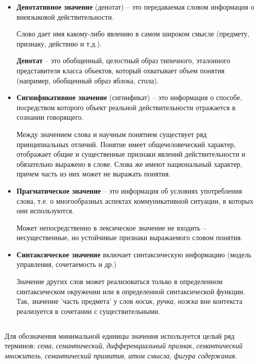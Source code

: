 \documentclass{article}
\begin{document}
\begin{itemize}
    \item \textbf{Денотативное значение} (денотат) -- это передаваемая словом информация о внеязыковой действительности.
    
    Слово дает имя какому-либо явлению в самом широком смысле (предмету, признаку, действию и т.д.).

    \textbf{Денотат} -- это обобщенный, целостный образ типичного, эталонного представителя
    класса объектов, который охватывает объем понятия (например, обобщенный образ яблока, стола).
    \item \textbf{Сигнификативное значение} (сигнификат) -- это информация о способе, посредством которого
    объект реальной действительности отражается в сознании говорящего.

    Между значением слова и научным понятием существует ряд принципиальных отличий. Понятие
    имеет общечеловеческий характер, отображает общие и существенные признаки явлений действительности
    и обязательно выражено в слове. Слова же имеют национальный характер, причем часть из них
    может не выражать понятия.

    \item \textbf{Прагматическое значение} -- это информация об условиях употребления слова,
    т.е. о многообразных аспектах коммуникативной ситуации, в которых они используются.

    Может непосредственно в лексическое значение не входить -- несущественные, но устойчивые признаки выражаемого словом понятия.
    \item \textbf{Синтаксическое значение} включает синтаксическую информацию (модель управления, сочетаемость и др.)
    
    Значение других слов может реализоваться только в определенном синтаксическом окружении
    или в определенной синтаксической функции. Так, значение 'часть предмета' у слов
    \textit{носик}, \textit{ручка}, \textit{ножка} вне контекста реализуется в сочетании
    с существительными.
\end{itemize}

\subsection{}
Для обозначения минимальной единицы значения используется целый ряд терминов:
\textit{сема}, \textit{семантический}, \textit{дифференциальный признак},
\textit{семантический множитель}, \textit{семантический примитив}, \textit{атом смысла},
\textit{фигура содержания}.
\end{document}

